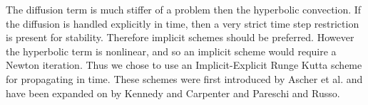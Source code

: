 The diffusion term is much stiffer of a problem then the hyperbolic convection.
If the diffusion is handled explicitly in time, then a very strict time step
restriction is present for stability.
Therefore implicit schemes should be preferred.
However the hyperbolic term is nonlinear, and so an implicit scheme would require a
Newton iteration.
Thus we chose to use an Implicit-Explicit Runge Kutta scheme for propagating in time.
These schemes were first introduced by Ascher et al.\cite{article:ascher1997implicit}
and have been expanded on by Kennedy and Carpenter\cite{kennedy2003additive} and
Pareschi and Russo\cite{article:pareschi2000IMEX}.

% 
%     
\clearpage
\pagebreak
